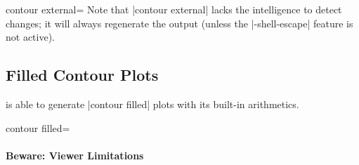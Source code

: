 {{\begin{plottype}[/pgfplots]{
    contour external=\textcolor{black}{}%
}
    Note that |contour external| lacks the intelligence to detect changes; it
    will always regenerate the output (unless the |-shell-escape| feature is
    not active).
\end{plottype}

%
%
%

}


\subsection{Filled Contour Plots}
\label{sec:pgfplots:filled:contour}

{
\PGFPlots{} is able to generate |contour filled| plots with its built-in
arithmetics.

\begin{plottype}[/pgfplots]{
    contour filled=\textcolor{black}{}%
}
    \paragraph{Beware: Viewer Limitations}


\end{plottype}}}

